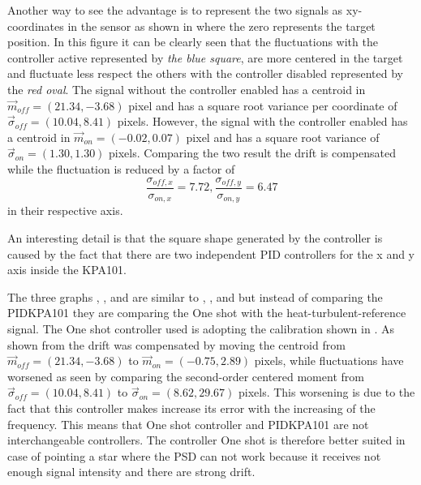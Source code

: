Another way to see the advantage is to represent the two signals as xy-coordinates in the sensor as shown in  where the zero represents the target position. In this figure it can be clearly seen that  the fluctuations with the controller active represented by \textit{the blue square}, are more centered in the target and fluctuate less respect the others with the controller disabled represented by the \textit{red oval}.
The signal without the controller enabled has a centroid in $\vec{m}_{off} = (21.34, -3.68)$ pixel and has a square root variance per coordinate of $\vec{\sigma}_{off} = (10.04, 8.41)$ pixels. However, the signal with the controller enabled has a centroid in $\vec{m}_{on} = (-0.02,0.07)$ pixel and has a square root variance of $\vec{\sigma}_{on} = (1.30, 1.30)$ pixels. Comparing the two result the drift is compensated while the fluctuation is reduced by a factor of
\begin{equation}
  \frac{\sigma_{off, x}}{\sigma_{on, x}} = 7.72, \frac{\sigma_{off, y}}{\sigma_{on, y}} = 6.47
\end{equation}
in their respective axis.

An interesting detail is that the square shape generated by the controller is caused by the fact that there are two independent PID controllers for the x and y axis inside the KPA101.


The three graphs , , and  are similar to , , and  but instead of comparing the PIDKPA101 they are comparing the One shot with the heat-turbulent-reference signal. The One shot controller used is adopting the calibration shown in .
As shown from  the drift was compensated by moving the centroid from $\vec{m}_{off} = (21.34, -3.68)$ to $\vec{m}_{on} = (-0.75, 2.89)$ pixels, while fluctuations have worsened as seen by comparing the second-order centered moment from $\vec{\sigma}_{off} = (10.04, 8.41)$ to $\vec{\sigma}_{on} = (8.62, 29.67)$ pixels.
This worsening is due to the fact that this controller makes increase its error with the increasing of the frequency.
This means that One shot controller and PIDKPA101 are not interchangeable controllers. The controller One shot is therefore better suited in case of pointing a star where the PSD can not work because it receives not enough signal intensity and there are strong drift.

